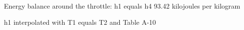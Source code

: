 Energy balance around the throttle:  
h1 equals h4  
93.42 kilojoules per kilogram  

h1 interpolated with T1 equals T2 and Table A-10
